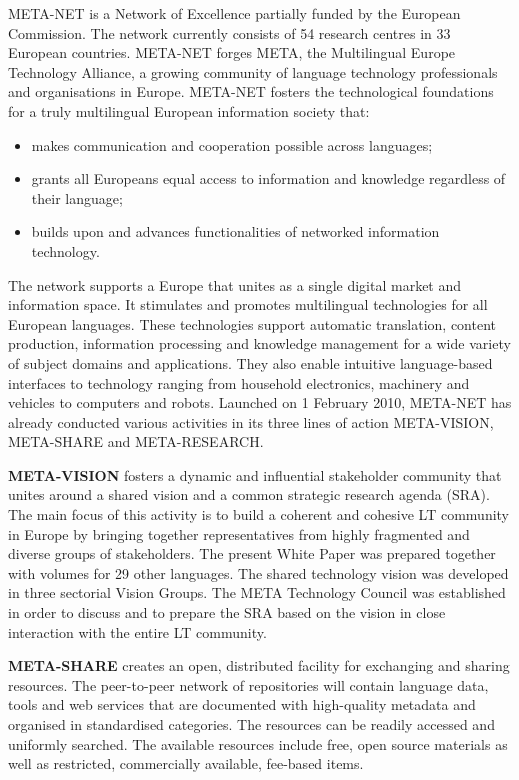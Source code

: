 \begin{multicols}{2}

META-NET is a Network of Excellence partially funded by the European Commission. The network currently consists of 54 research centres in 33 European countries\cite{rehm2011}. META-NET forges META, the Multilingual Europe Technology Alliance, a growing community of language technology professionals and organisations in Europe. META-NET fosters the technological foundations for a truly multilingual European information society that:

\begin{itemize}
\item makes communication and cooperation possible across languages;
\item grants all Europeans equal access to information and knowledge regardless of their language;
\item builds upon and advances functionalities of networked information technology.
\end{itemize}

The network supports a Europe that unites as a single digital market and information space. It stimulates and promotes multilingual technologies for all European languages. These technologies support automatic translation, content production, information processing and knowledge management for a wide variety of subject domains and applications. They also enable intuitive language-based interfaces to technology ranging from household electronics, machinery and vehicles to computers and robots.
Launched on 1 February 2010, META-NET has already conducted various activities in its three lines of action META-VISION, META-SHARE and META-RESEARCH.

\textbf{META-VISION} fosters a dynamic and influential stakeholder community that unites around a shared vision and a common strategic research agenda (SRA). The main focus of this activity is to build a coherent and cohesive LT community in Europe by bringing together representatives from highly fragmented and diverse groups of stakeholders. The present White Paper was prepared together with volumes for 29 other languages. The shared technology vision was developed in three sectorial Vision Groups. The META Technology Council was established in order to discuss and to prepare the SRA based on the vision in close interaction with the entire LT community.

\textbf{META-SHARE} creates an open, distributed facility for exchanging and sharing resources. The peer-to-peer network of repositories will contain language data, tools and web services that are documented with high-quality metadata and organised in standardised categories. The resources can be readily accessed and uniformly searched. The available resources include free, open source materials as well as restricted, commercially available, fee-based items.


\end{multicols}
